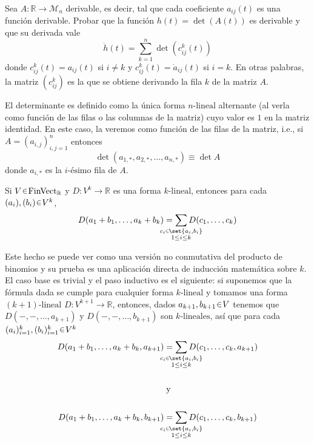 \begin{ejer}
Sea $A:\mathbb{R} \to \mathcal{M}_n$ derivable, es decir, tal que cada coeficiente $a_{ij}(t)$ es una función derivable. Probar que la función $h(t) = \det(A(t))$ es derivable y que su derivada vale
\[
\dot{h}(t) = \sum_{k=1}^{n} \det(c^k_{ij}(t))
\]
donde $c^k_{ij}(t) = a_{ij}(t)$ si $i \neq k$ y $c^k_{ij}(t) = \dot{a}_{ij}(t)$ si $i = k$. En otras palabras, la matriz $(c^k_{ij})$ es la que se obtiene derivando la fila $k$ de la matriz $A$.
\end{ejer}
\begin{sol}[Demostración]
El determinante es definido como la única forma $n\text{-lineal}$ alternante (al verla como función de las filas o las columnas de la matriz) cuyo valor es $1$ en la matriz identidad. En este caso, la veremos como función de las filas de la matriz, i.e., si $A = (a_{i,j})^n_{i,j=1}$ entonces
\[
\det(a_{1,*}, a_{2,*}, \dots, a_{n,*}) \equiv \det A
\]
donde $a_{i,*}$ es la $i\text{-ésimo}$ fila de $A$.\par
\begin{lema}\label{lema:Binom}
Si $V \en \mathrm{FinVect}_{\mathbb{R}}$ y $D \colon V^k \to \mathbb{R}$ es una forma $k\text{-lineal}$, entonces para cada $(a_i),(b_i) \en V^k$,
\[
D(a_1 +b_1,\dots,a_{k}+b_{k})%
= \sum_{\mathclap{\substack{c_i \en \set{a_i,b_i}\\1\leq i \leq k}}} D(c_1,\dots,c_{k})
\]
\end{lema}
Este hecho se puede ver como una versión no conmutativa del producto de binomios y su prueba es una aplicación directa de inducción matemática sobre $k$. El caso base es trivial y el paso inductivo es el siguiente: si suponemos que la fórmula dada se cumple para cualquier forma $k\text{-lineal}$ y tomamos una forma $(k+1)\text{-lineal}$ $D \colon V^{k+1} \to \mathbb{R}$, entonces, dados $a_{k+1},b_{k+1} \en V$ tenemos que $D(-,-,\dots,a_{k+1})$ y $D(-,-,\dots,b_{k+1})$ son $k\text{-lineales}$, así que para cada $(a_i)^k_{i=1},(b_i)^k_{i=1} \en V^k$
\begin{align*}
D(a_1 +b_1,\dots,a_k+b_k,a_{k+1})%
&= \sum_{\mathclap{\substack{c_i \en \set{a_i,b_i}\\1\leq i \leq k}}} D(c_1,\dots,c_k,a_{k+1})\\
\\
&\;\text{y}\\
\\
D(a_1 +b_1,\dots,a_k+b_k,b_{k+1})
&= \sum_{\mathclap{\substack{c_i \en \set{a_i,b_i}\\1\leq i \leq k}}} D(c_1,\dots,c_k,b_{k+1})

\end{align*}
\end{sol}

